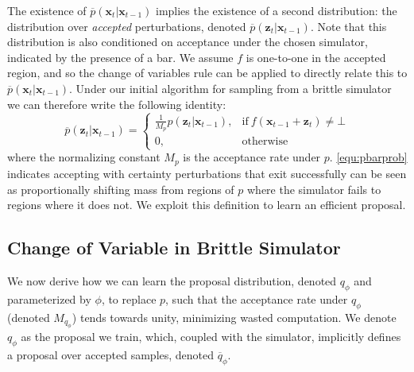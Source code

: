 

The existence of $\overline{p}(\mathbf{x}_t | \mathbf{x}_{t-1})$ implies the existence of a second distribution: the distribution over \emph{accepted} perturbations, denoted $\overline{p}(\mathbf{z}_t | \mathbf{x}_{t-1})$.
Note that this distribution is also conditioned on acceptance under the chosen simulator, indicated by the presence of a bar.
We assume $f$ is one-to-one in the accepted region, and so the change of variables rule can be applied to directly relate this to $\overline{p}(\mathbf{x}_t | \mathbf{x}_{t-1})$.
Under our initial algorithm for sampling from a brittle simulator we can therefore write the following identity:
\begin{equation}
\overline{p}(\mathbf{z}_t | \mathbf{x}_{t-1}) = \begin{cases}
      \frac{1}{M_p} p(\mathbf{z}_t | \mathbf{x}_{t-1}), & \text{if}\ f(\mathbf{x}_{t-1} + \mathbf{z}_t)\neq \bot \label{equ:pbarprob}\\
      0, & \text{otherwise}
    \end{cases}
\end{equation}
where the normalizing constant $M_p$ is the acceptance rate under $p$.
\eqref{equ:pbarprob} indicates accepting with certainty perturbations that exit successfully can be seen as proportionally shifting mass from regions of $p$ where the simulator fails to regions where it does not. 
We exploit this definition to learn an efficient proposal.

\subsection{Change of Variable in Brittle Simulator}
\label{sec:meth:cov}
We now derive how we can learn the proposal distribution, denoted $q_{\phi}$ and parameterized by $\phi$, to replace $p$, such that the acceptance rate under $q_{\phi}$ (denoted $M_{q_{\phi}}$) tends towards unity, minimizing wasted computation.
We denote $q_{\phi}$ as the proposal we train, which, coupled with the simulator, implicitly defines a proposal over accepted samples, denoted $\overline{q}_{\phi}$.

